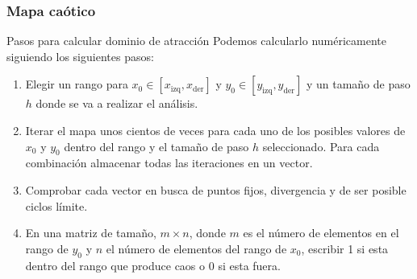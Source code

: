 \documentclass[10pt]{beamer}
\begin{document}
\begin{frame}
    \frametitle{Mapa caótico}
     \begin{block}{Pasos para calcular dominio de atracción}
        \justifying
        Podemos calcularlo numéricamente siguiendo los siguientes pasos:

        \begin{enumerate}
            \item Elegir un rango para $x_{0} \in [x_{\text{izq}}, x_{\text{der}}]$ y $y_{0} \in [y_{\text{izq}}, y_{\text{der}}]$ y un tamaño de paso $h$ donde se va a realizar el análisis.
            \item Iterar el mapa unos cientos de veces para cada uno de los posibles valores de $x_{0}$ y $y_{0}$ dentro del rango y el tamaño de paso $h$ seleccionado. Para cada combinación almacenar todas las iteraciones en un vector.
            \item Comprobar cada vector en busca de puntos fijos, divergencia y de ser posible ciclos límite.
            \item En una matriz de tamaño, $m \times n$, donde $m$ es el número de elementos en el rango de $y_{0}$ y $n$ el número de elementos del rango de $x_{0}$, escribir 1 si esta dentro del rango que produce caos o $0$ si esta fuera.
        \end{enumerate}
	\end{block}
\end{frame}
\end{document}
